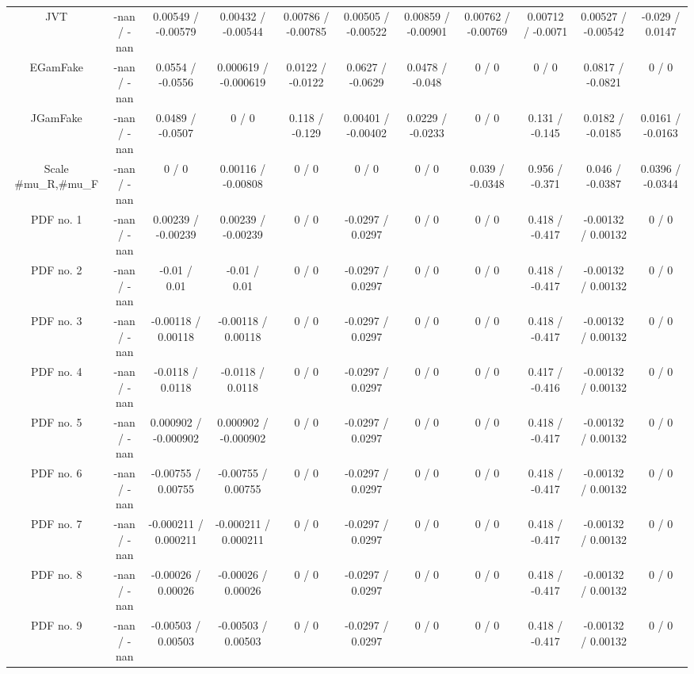 \begin{table}[htbp]
\begin{center}
\begin{tabular}{|c|c|c|c|c|c|c|c|c|c|c|}
  JVT & -nan / -nan & 0.00549 / -0.00579 & 0.00432 / -0.00544 & 0.00786 / -0.00785 & 0.00505 / -0.00522 & 0.00859 / -0.00901 & 0.00762 / -0.00769 & 0.00712 / -0.0071 & 0.00527 / -0.00542 & -0.029 / 0.0147 \\ 
  EGamFake & -nan / -nan & 0.0554 / -0.0556 & 0.000619 / -0.000619 & 0.0122 / -0.0122 & 0.0627 / -0.0629 & 0.0478 / -0.048 & 0 / 0 & 0 / 0 & 0.0817 / -0.0821 & 0 / 0 \\ 
  JGamFake & -nan / -nan & 0.0489 / -0.0507 & 0 / 0 & 0.118 / -0.129 & 0.00401 / -0.00402 & 0.0229 / -0.0233 & 0 / 0 & 0.131 / -0.145 & 0.0182 / -0.0185 & 0.0161 / -0.0163 \\ 
  Scale #mu_{R},#mu_{F} & -nan / -nan & 0 / 0 & 0.00116 / -0.00808 & 0 / 0 & 0 / 0 & 0 / 0 & 0.039 / -0.0348 & 0.956 / -0.371 & 0.046 / -0.0387 & 0.0396 / -0.0344 \\ 
  PDF no. 1 & -nan / -nan & 0.00239 / -0.00239 & 0.00239 / -0.00239 & 0 / 0 & -0.0297 / 0.0297 & 0 / 0 & 0 / 0 & 0.418 / -0.417 & -0.00132 / 0.00132 & 0 / 0 \\ 
  PDF no. 2 & -nan / -nan & -0.01 / 0.01 & -0.01 / 0.01 & 0 / 0 & -0.0297 / 0.0297 & 0 / 0 & 0 / 0 & 0.418 / -0.417 & -0.00132 / 0.00132 & 0 / 0 \\ 
  PDF no. 3 & -nan / -nan & -0.00118 / 0.00118 & -0.00118 / 0.00118 & 0 / 0 & -0.0297 / 0.0297 & 0 / 0 & 0 / 0 & 0.418 / -0.417 & -0.00132 / 0.00132 & 0 / 0 \\ 
  PDF no. 4 & -nan / -nan & -0.0118 / 0.0118 & -0.0118 / 0.0118 & 0 / 0 & -0.0297 / 0.0297 & 0 / 0 & 0 / 0 & 0.417 / -0.416 & -0.00132 / 0.00132 & 0 / 0 \\ 
  PDF no. 5 & -nan / -nan & 0.000902 / -0.000902 & 0.000902 / -0.000902 & 0 / 0 & -0.0297 / 0.0297 & 0 / 0 & 0 / 0 & 0.418 / -0.417 & -0.00132 / 0.00132 & 0 / 0 \\ 
  PDF no. 6 & -nan / -nan & -0.00755 / 0.00755 & -0.00755 / 0.00755 & 0 / 0 & -0.0297 / 0.0297 & 0 / 0 & 0 / 0 & 0.418 / -0.417 & -0.00132 / 0.00132 & 0 / 0 \\ 
  PDF no. 7 & -nan / -nan & -0.000211 / 0.000211 & -0.000211 / 0.000211 & 0 / 0 & -0.0297 / 0.0297 & 0 / 0 & 0 / 0 & 0.418 / -0.417 & -0.00132 / 0.00132 & 0 / 0 \\ 
  PDF no. 8 & -nan / -nan & -0.00026 / 0.00026 & -0.00026 / 0.00026 & 0 / 0 & -0.0297 / 0.0297 & 0 / 0 & 0 / 0 & 0.418 / -0.417 & -0.00132 / 0.00132 & 0 / 0 \\ 
  PDF no. 9 & -nan / -nan & -0.00503 / 0.00503 & -0.00503 / 0.00503 & 0 / 0 & -0.0297 / 0.0297 & 0 / 0 & 0 / 0 & 0.418 / -0.417 & -0.00132 / 0.00132 & 0 / 0 \\ 

\end{tabular}
\end{center}
\end{table}
